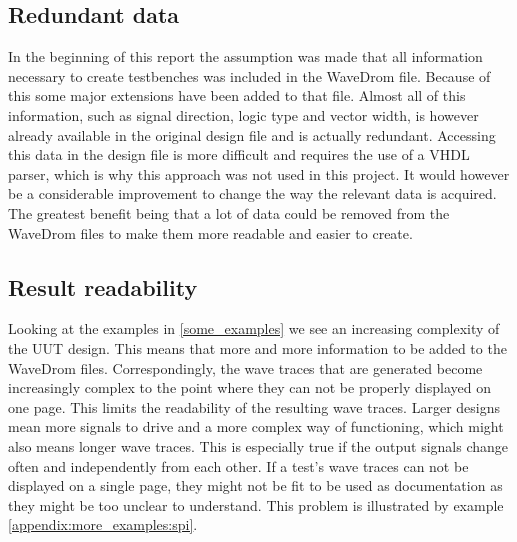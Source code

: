 \subsection{Redundant data}
In the beginning of this report the assumption was made that all information necessary to create testbenches was included in the WaveDrom file. Because of this some major extensions have been added to that file. Almost all of this information, such as signal direction, logic type and vector width, is however already available in the original design file and is actually redundant. Accessing this data in the design file is more difficult and requires the use of a VHDL parser, which is why this approach was not used in this project.
\npar
It would however be a considerable improvement to change the way the relevant data is acquired. The greatest benefit being that a lot of data could be removed from the WaveDrom files to make them more readable and easier to create.
\subsection{Result readability}
Looking at the examples in \ref{some_examples} we see an increasing complexity of the UUT design. This means that more and more information to be added to the WaveDrom files. Correspondingly, the wave traces that are generated become increasingly complex to the point where they can not be properly displayed on one page. This limits the readability of the resulting wave traces. 
\npar
Larger designs mean more signals to drive and a more complex way of functioning, which might also means longer wave traces. This is especially true if the output signals change often and independently from each other.
\npar
If a test's wave traces can not be displayed on a single page, they might not be fit to be used as documentation as they might be too unclear to understand. This problem is illustrated by example \ref{appendix:more_examples:spi}.\newpage
